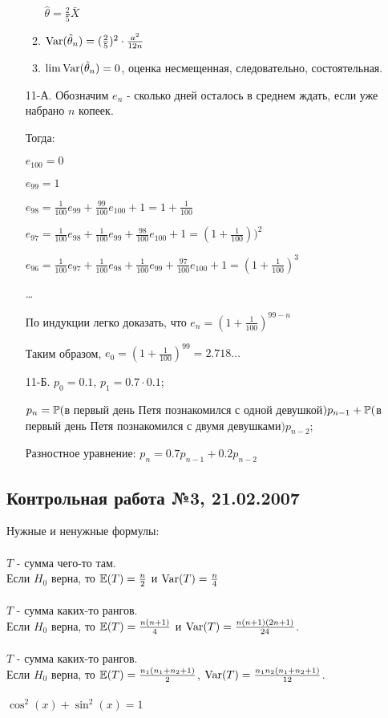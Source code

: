 \begin{enumerate}
\begin{enumerate}
$\hat{\theta}=\frac{2}{5}\bar{X}$
\item $\Var(\hat{\theta}_{n})=(\frac{2}{5})^{2}\cdot\frac{a^{2}}{12n}$
\item $\lim \Var(\hat{\theta}_{n})=0$, оценка несмещенная,
следовательно, состоятельная.
\end{enumerate}
\item[11-А.] Обозначим $e_{n}$ - сколько дней осталось в среднем ждать, если
уже набрано $n$ копеек.

Тогда:

$e_{100}=0$

$e_{99}=1$

$e_{98}=\frac{1}{100}e_{99}+\frac{99}{100}e_{100}+1=1+\frac{1}{100}$

$e_{97}=\frac{1}{100}e_{98}+\frac{1}{100}e_{99}+\frac{98}{100}e_{100}+1=(1+\frac{1}{100}))^{2}$

$e_{96}=\frac{1}{100}e_{97}+\frac{1}{100}e_{98}+\frac{1}{100}e_{99}+\frac{97}{100}e_{100}+1=(1+\frac{1}{100})^{3}$

\ldots

По индукции легко доказать, что $e_{n}=(1+\frac{1}{100})^{99-n}$

Таким образом, $e_{0}=(1+\frac{1}{100})^{99}=2.718 \ldots$

\item[11-Б.]  $p_{0}=0.1$, $p_{1}=0.7\cdot 0.1$;

$p_{n}=\P($в первый день Петя познакомился с одной
девушкой$)p_{n-1}+\P($в первый день Петя познакомился с двумя
девушками$)p_{n-2}$;

Разностное уравнение: $p_{n}=0.7p_{n-1}+0.2p_{n-2}$
\end{enumerate}

\subsection{Контрольная работа №3, 21.02.2007}

Нужные и ненужные формулы: \\ \\
$T$ - сумма чего-то там. \\
Если $H_{0}$ верна, то $\E(T)=\frac{n}{2}$ и $\Var(T)=\frac{n}{4}$ \\ \\
$T$ - сумма каких-то рангов. \\
Если $H_{0}$ верна, то $\E(T)=\frac{n(n+1)}{4}$ и
$\Var(T)=\frac{n(n+1)(2n+1)}{24}$. \\ \\
$T$ - сумма каких-то рангов. \\
Если $H_{0}$ верна, то $\E(T)=\frac{n_{1}(n_{1}+n_{2}+1)}{2}$,
$\Var(T)=\frac{n_{1}n_{2}(n_{1}+n_{2}+1)}{12}$. \\ \\
$\cos^{2}(x)+\sin^{2}(x)=1$ \\ \\

